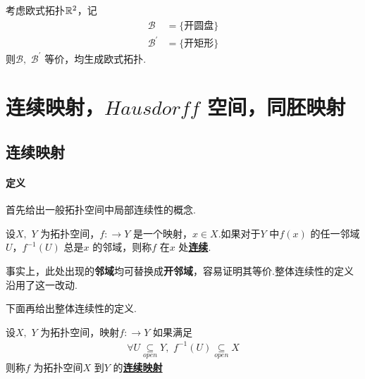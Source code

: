 	\begin{example}\label{ex 1.1.4}
		考虑欧式拓扑$\mathbb{R}^2$，记
		\begin{align}
			\mathcal{B} &= \{ \text{开圆盘} \}\\
			\mathcal{B}^{'} &= \{ \text{开矩形} \}
		\end{align}
		则$\mathcal{B} , \,\, \mathcal{B}^{'}$ 等价，均生成欧式拓扑.
	\end{example}

\newpage
\section{连续映射，$Hausdorff$ 空间，同胚映射}
\subsection{连续映射}
\paragraph{定义}
	首先给出一般拓扑空间中局部连续性的概念.
	\begin{defn}\label{def 1.2.1}
		设$X , \,\, Y$ 为拓扑空间，$f : \longrightarrow Y$ 是一个映射，$x \in X$.如果对于$Y$ 中$f(x)$ 的任一邻域$U$，$f^{-1}(U)$ 总是$x$ 的邻域，则称$f$ 在$x$ 处\underline{\textbf{连续}}.
		\begin{rmk}
			事实上，此处出现的\textbf{邻域}均可替换成\textbf{开邻域}，容易证明其等价.整体连续性的定义沿用了这一改动.
		\end{rmk}
	\end{defn}
	
	下面再给出整体连续性的定义.
	\begin{defn}\label{def 1.2.2}
		设$X , \,\, Y$ 为拓扑空间，映射$f : \longrightarrow Y$ 如果满足
		\begin{align}
			\forall U \underset{open}{\subseteq} Y , \,\, f^{-1}(U) \underset{open}{\subseteq} X
		\end{align}
		则称$f$ 为拓扑空间$X$ 到$Y$ 的\underline{\textbf{连续映射}}
	\end{defn}

\vspace*{2em}
